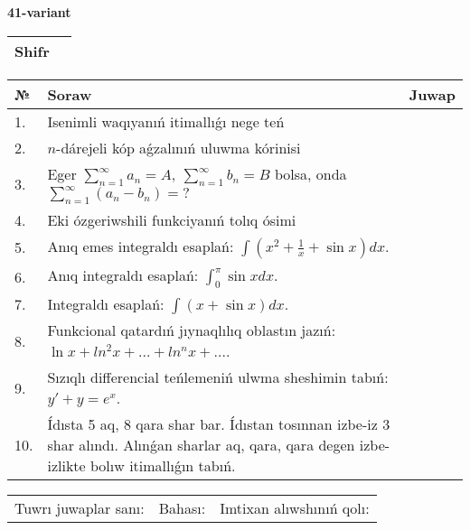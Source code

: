 \documentclass{article}
\begin{document}
  \egroup
  
  \newpage
  
  
  \textbf{41-variant}\\
  
  \bgroup
  \def\arraystretch{1.6} %
  
  \begin{tabular}{|m{5.7cm}|m{9.5cm}|}
  \hline
  Shifr & \\
  \hline
  \end{tabular}
  
  \vspace{1cm}
  
  \begin{tabular}{|m{0.7cm}|m{10cm}|m{4cm}|}
  \hline
  № & Soraw & Juwap \\
  \hline
  1. & Isenimli waqıyanıń itimallıǵı nege teń &  \\
  \hline
  2. & \(n\)-dárejeli kóp aǵzalınıń uluwma kórinisi &  \\
  \hline
  3. & Eger \(\sum_{n = 1}^{\infty}a_{n} = A,\ \sum_{n = 1}^{\infty}b_{n} = B\) bolsa, onda \(\sum_{n = 1}^{\infty}\left( a_{n} - b_{n} \right) = ?\) &  \\
  \hline
  4. & Eki ózgeriwshili funkciyanıń tolıq ósimi &  \\
  \hline
  5. & Anıq emes integraldı esaplań: \(\int{\left( x^2  + \frac{1}{x} + \sin x \right)dx}\). &  \\
  \hline
  6. & Anıq integraldı esaplań: \(\int_{0}^{\pi}{\sin xdx}\). &  \\
  \hline
  7. & Integraldı esaplań: \(\int{(x + \sin x)dx}\). &  \\
  \hline
  8. & Funkcional qatardıń jıynaqlılıq oblastın jazıń: \(\ln x + ln^2 x + ... + ln^{n}x + ...\). &  \\
  \hline
  9. & Sızıqlı differencial teńlemeniń ulwma sheshimin tabıń: \(y' + y = e^{x}\). &  \\
  \hline
  10. & Ídısta 5 aq, 8 qara shar bar. Ídıstan tosınnan izbe-iz 3 shar alındı. Alınǵan sharlar aq, qara, qara degen izbe-izlikte bolıw itimallıǵın tabıń. &  \\
  \hline
  \end{tabular}
  
  \vspace{1cm}
  
  \begin{tabular}{lll}
  Tuwrı juwaplar sanı: \underline{\hspace{1.5cm}} & 
  Bahası: \underline{\hspace{1.5cm}} & 
  Imtixan alıwshınıń qolı: \underline{\hspace{2cm}} \\
  \end{tabular}
  
\end{document}
